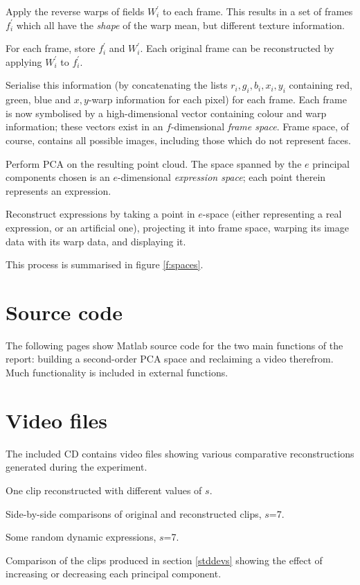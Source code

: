 \begin{enoomerate}
\item Apply the reverse warps of fields $W_i^\prime$ to each frame. This results in a set of frames $f_i^\prime$ which all have the \textit{shape} of the warp mean, but different texture information.
\item For each frame, store $f_i^\prime$ and $W_i^\prime$. Each original frame can be reconstructed by applying $W_i^\prime$ to $f_i^\prime$.
\item Serialise this information (by concatenating the lists ${r_i,g_i,b_i,x_i,y_i}$ containing red, green, blue and ${x,y}$-warp information for each pixel) for each frame. Each frame is now symbolised by a high-dimensional vector containing colour and warp information; these vectors exist in an $f$-dimensional \textit{frame space}. Frame space, of course, contains all possible images, including those which do not represent faces.
\item Perform PCA on the resulting point cloud. The space spanned by the $e$ principal components chosen is an $e$-dimensional \textit{expression space}; each point therein represents an expression.
\item Reconstruct expressions by taking a point in $e$-space (either representing a real expression, or an artificial one), projecting it into frame space, warping its image data with its warp data, and displaying it.
\end{enoomerate}

This process is summarised in figure \ref{f:spaces}.


\section{Source code}
\label{appb}

The following pages show Matlab source code for the two main functions of the report: building a second-order PCA space and reclaiming a video therefrom. Much functionality is included in external functions.

\cleardoublepage

\section{Video files}
\label{appc}

The included CD contains video files showing various comparative reconstructions generated during the experiment.


\begin{itemise}
\item One clip reconstructed with different values of $s$.
\item Side-by-side comparisons of original and reconstructed clips, $s$=7.
\item Some random dynamic expressions, $s$=7.
\item Comparison of the clips produced in section \ref{stddevs} showing the effect of increasing or decreasing each principal component.
\end{itemise}
\cleardoublepage

